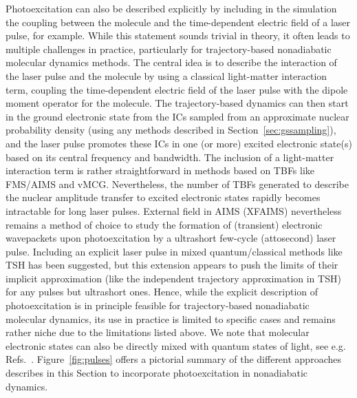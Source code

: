 \documentclass[9pt,bestpractices,pubversion]{livecoms}
\begin{document}
Photoexcitation can also be described explicitly by including in the simulation the coupling between the molecule and the time-dependent electric field of a laser pulse, for example. While this statement sounds trivial in theory, it often leads to multiple challenges in practice, particularly for trajectory-based nonadiabatic molecular dynamics methods. The central idea is to describe the interaction of the laser pulse and the molecule by using a classical light-matter interaction term, coupling the time-dependent electric field of the laser pulse with the dipole moment operator for the molecule. The trajectory-based dynamics can then start in the ground electronic state from the ICs sampled from an approximate nuclear probability density (using any methods described in Section~\ref{sec:gssampling}), and the laser pulse promotes these ICs in one (or more) excited electronic state(s) based on its central frequency and bandwidth. 
The inclusion of a light-matter interaction term is rather straightforward in methods based on TBFs like FMS/AIMS and vMCG.\cite{mignolet2016communication,penfold2019excited} Nevertheless, the number of TBFs generated to describe the nuclear amplitude transfer to excited electronic states rapidly becomes intractable for long laser pulses. External field in AIMS (XFAIMS) nevertheless remains a method of choice to study the formation of (transient) electronic wavepackets upon photoexcitation by a ultrashort few-cycle (attosecond) laser pulse.\cite{mignolet2016communication,mignolet2018walk,mignolet2019steering,mignolet2019sub} Including an explicit laser pulse in mixed quantum/classical methods like TSH has been suggested,\cite{mitric2009c,tavernelli2010mixed,richter2011sharc} but this extension appears to push the limits of their implicit approximation (like the independent trajectory approximation in TSH) for any pulses but ultrashort ones.\cite{bajo2014interplay,mignolet2019excited} Hence, while the explicit description of photoexcitation is in principle feasible for trajectory-based nonadiabatic molecular dynamics, its use in practice is limited to specific cases and remains rather niche due to the limitations listed above. We note that molecular electronic states can also be directly mixed with quantum states of light, see e.g. Refs.~. Figure~\ref{fig:pulses} offers a pictorial summary of the different approaches describes in this Section to incorporate photoexcitation in nonadiabatic dynamics.
\end{document}
